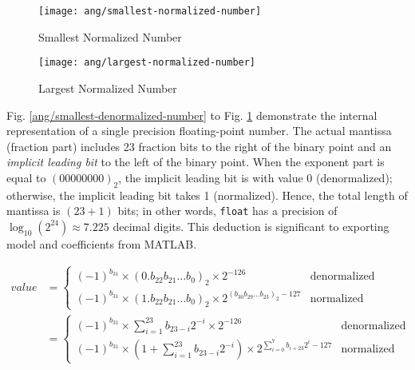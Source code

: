 \begin{figure}[H]
\begin{minipage}[t]{0.5\linewidth}
\centering
\texttt{[image: ang/smallest-normalized-number]}
\caption{Smallest Normalized Number}
\label{ang/smallest-normalized-number}
\end{minipage}
\begin{minipage}[t]{0.5\linewidth}
\centering
\texttt{[image: ang/largest-normalized-number]}
\caption{Largest Normalized Number}
\label{ang/largest-normalized-number}
\end{minipage}
\end{figure}

Fig. \ref{ang/smallest-denormalized-number} to Fig. \ref{ang/largest-normalized-number} demonstrate the internal representation of a single precision floating-point number. The actual mantissa (fraction part) includes 23 fraction bits to the right of the binary point and an \textit{implicit leading bit} to the left of the binary point. When the exponent part is equal to $(00000000)_2$, the implicit leading bit is with value 0 (denormalized); otherwise, the implicit leading bit takes 1 (normalized). Hence, the total length of mantissa is $(23 + 1)$ bits; in other words, \texttt{float} has a precision of $\log_{10}(2^{24}) \approx 7.225$ decimal digits. This deduction is significant to exporting model and coefficients from MATLAB.

\begin{align}
value &=
\begin{cases}
(-1)^{b_{31}} \times (0.b_{22}b_{21} \dots b_{0})_2 \times 2^{- 126} &\text{denormalized}\\
(-1)^{b_{31}} \times (1.b_{22}b_{21} \dots b_{0})_2 \times 2^{(b_{30}b_{29} \dots b_{23})_2 - 127} &\text{normalized}
\end{cases}\\
&=
\begin{cases}
\displaystyle(-1)^{b_{31}} \times \sum_{i=1}^{23} b_{23-i} 2^{-i} \times 2^{- 126} &\text{denormalized}\\
\displaystyle(-1)^{b_{31}} \times ( 1 + \sum_{i=1}^{23} b_{23-i} 2^{-i} ) \times 2^{\sum_{i=0}^{7} b_{i+23} 2^i - 127} &\text{normalized}
\end{cases}
\end{align}


